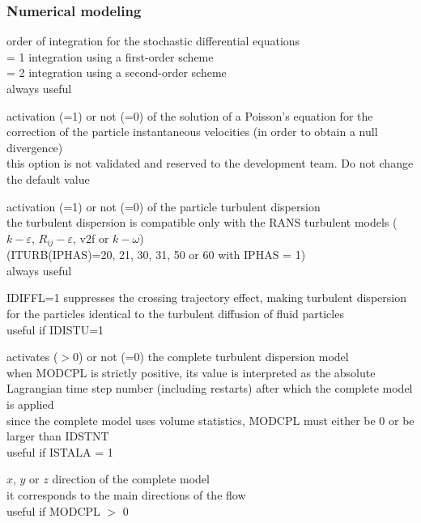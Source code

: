 \subsubsection{Numerical modeling}

{order of integration for the stochastic differential equations\\
\hspace*{1.3cm} = 1 integration using a first-order scheme\\
\hspace*{1.3cm} = 2 integration using a second-order scheme\\
always useful}

{activation (=1) or not (=0) of the solution of a Poisson's equation for
the correction of the particle instantaneous velocities (in order to obtain a
null divergence)\\
this option is not validated and reserved to the development team. Do not change
the default value}

{activation (=1) or not (=0) of the particle turbulent dispersion\\
the turbulent dispersion is compatible only with the RANS turbulent models
($k-\varepsilon$, $R_{ij}-\varepsilon$, v2f or $k-\omega$)\\
(ITURB(IPHAS)=20, 21, 30, 31, 50 or 60 with IPHAS = 1)\\
always useful}

{IDIFFL=1 suppresses the crossing trajectory effect, making turbulent dispersion
for the particles identical to the turbulent diffusion of fluid particles\\
useful if IDISTU=1}

{activates ($>$0) or not (=0) the complete turbulent dispersion model\\
when MODCPL is strictly positive, its value is interpreted as the absolute
Lagrangian time step number (including restarts) after which the complete model
is applied\\ 
since the complete model uses volume statistics, MODCPL must either be 0 or be
larger than IDSTNT\\
useful if ISTALA = 1}

{$x$, $y$ or $z$ direction of the complete model\\
it corresponds to the main directions of the flow\\
useful if MODCPL $>$ 0}

